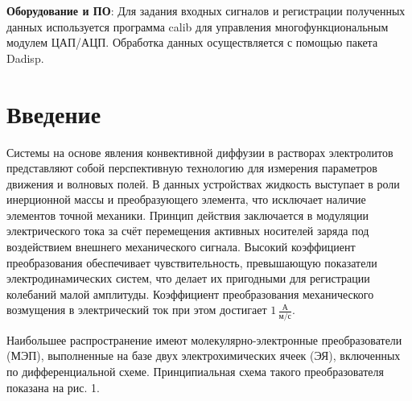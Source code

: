 \documentclass[12pt, a4paper]{article}
\begin{document}
\textbf{Оборудование и ПО}: Для задания входных сигналов и регистрации  полученных данных 
используется программа calib для управления многофункциональным модулем ЦАП/АЦП. Обработка данных осуществляется с помощью пакета Dadisp. 

\section*{Введение}

Системы на основе явления конвективной диффузии в растворах электролитов представляют собой перспективную технологию для измерения параметров движения и волновых полей. В данных устройствах жидкость выступает в роли инерционной массы и преобразующего элемента, что исключает наличие элементов точной механики. Принцип действия заключается в модуляции электрического тока за счёт перемещения активных носителей заряда под воздействием внешнего механического сигнала. Высокий коэффициент преобразования обеспечивает чувствительность, превышающую показатели электродинамических систем, что делает их пригодными для регистрации колебаний малой амплитуды. Коэффициент преобразования механического возмущения в электрический ток при этом достигает $1\,\frac{\text{А}}{\text{м/с}}$.

Наибольшее распространение имеют молекулярно-электронные преобразователи (МЭП), выполненные на базе двух электрохимических ячеек (ЭЯ), включенных по дифференциальной схеме. Принципиальная схема такого преобразователя показана на рис. 1. 
\end{document}
